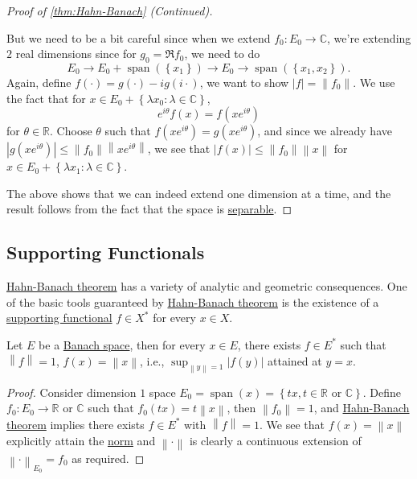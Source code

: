 \begin{proof}[Proof of \autoref{thm:Hahn-Banach} (Continued)]
\begin{itemize}
		      But we need to be a bit careful since when we extend \(f_0 \colon E_0 \to \mathbb{C} \), we're extending \(2\) real dimensions since for \(g_0 = \Re f_0\), we need to do
		      \[
			      E_0
			      \to E_0 + \mathop{\mathrm{span}}(\left\{ x_1 \right\})
			      \to E_0 \to \mathop{\mathrm{span}}(\left\{ x_1, x_2 \right\}).
		      \]
		      Again, define \(f(\cdot) = g(\cdot) - ig(i\cdot)\), we want to show \(\left\vert f \right\vert = \left\lVert f_0\right\rVert \). We use the fact that for \(x\in E_{0} + \left\{ \lambda x_0\colon \lambda \in \mathbb{C}  \right\}\),
		      \[
			      e^{i \theta }f(x) = f(x e^{i \theta })
		      \]
		      for \(\theta \in \mathbb{R} \). Choose \(\theta \) such that \(f(x e^{i \theta }) = g(x e^{i \theta })\), and since we already have \(\left\vert g(xe^{i \theta }) \right\vert \leq \left\lVert f_0\right\rVert \left\lVert x e^{i \theta }\right\rVert \), we see that \(\left\vert f(x) \right\vert \leq \left\lVert f_0\right\rVert \left\lVert x\right\rVert \) for \(x\in E_0 + \left\{ \lambda x_1 \colon \lambda \in \mathbb{C}  \right\} \).
	\end{itemize}
	The above shows that we can indeed extend one dimension at a time, and the result follows from the fact that the space is \hyperref[def:separable]{separable}.
\end{proof}

\subsection{Supporting Functionals}
\hyperref[thm:Hahn-Banach]{Hahn-Banach theorem} has a variety of analytic and geometric consequences. One of the basic tools guaranteed by \hyperref[thm:Hahn-Banach]{Hahn-Banach theorem} is the existence of a \hyperref[thm:supporting-functional]{supporting functional} \(f\in X^{\ast} \) for every \(x\in X\).

\begin{theorem}\label{thm:supporting-functional}
	Let \(E\) be a \hyperref[def:Banach-space]{Banach space}, then for every \(x\in E\), there exists \(f\in E^{\ast} \)  such that \(\left\lVert f\right\rVert = 1\), \(f(x) = \left\lVert x\right\rVert \), i.e., \(\sup _{\left\lVert y\right\rVert = 1} \left\vert f(y) \right\vert \) attained at \(y = x\).
\end{theorem}
\begin{proof}
	Consider dimension \(1\) space \(E_0 = \mathop{\mathrm{span}}(x) = \left\{ tx,t\in \mathbb{R} \text{ or }\mathbb{C}   \right\} \). Define \(f_0\colon E_0 \to \mathbb{R} \) or \(\mathbb{C} \) such that \(f_0(tx) = t \left\lVert x\right\rVert \), then \(\left\lVert f_0\right\rVert = 1\), and \hyperref[thm:Hahn-Banach]{Hahn-Banach theorem} implies there exists \(f\in E^{\ast} \) with \(\left\lVert f\right\rVert = 1\). We see that \(f(x) = \left\lVert x\right\rVert \) explicitly attain the \hyperref[def:norm]{norm} and \(\left\lVert \cdot \right\rVert \) is clearly a continuous extension of \(\left\lVert \cdot \right\rVert _{E_0}= f_0\) as required.
\end{proof}


